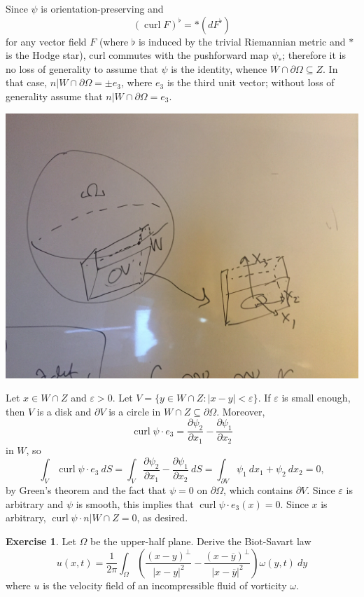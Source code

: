 \documentclass[10pt]{article}
\DeclareMathOperator{\curl}{curl}
\theoremstyle{definition}
\newtheorem{exer}{Exercise}
\begin{document}
Since $\psi$ is orientation-preserving and
\begin{equation}
\label{coordinate invariant curl}
(\curl F)^\flat = *(dF^\flat)
\end{equation}
for any vector field $F$ (where $\flat$ is induced by the trivial Riemannian metric and $*$ is the Hodge star), curl commutes with the pushforward map $\psi_*$; therefore it is no loss of generality to assume that $\psi$ is the identity, whence $W \cap \partial \Omega \subseteq Z$.
In that case, $n|W \cap \partial \Omega = \pm e_3$, where $e_3$ is the third unit vector; without loss of generality assume that $n|W \cap \partial \Omega = e_3$.

\includegraphics[scale=0.07]{fluids_1_coords.jpg}

Let $x \in W \cap Z$ and $\varepsilon > 0$. Let $V = \{y \in W \cap Z: |x - y| < \varepsilon\}$.
If $\varepsilon$ is small enough, then $V$ is a disk and $\partial V$ is a circle in $W \cap Z \subseteq \partial \Omega$.
Moreover,
$$\curl \psi \cdot e_3 = \frac{\partial \psi_2}{\partial x_1} - \frac{\partial \psi_1}{\partial x_2}$$
in $W$, so
$$\int_V \curl \psi \cdot e_3 ~dS = \int_V \frac{\partial \psi_2}{\partial x_1} - \frac{\partial \psi_1}{\partial x_2} ~dS = \int_{\partial V} \psi_1 ~dx_1 + \psi_2 ~dx_2 = 0,$$
by Green's theorem and the fact that $\psi = 0$ on $\partial \Omega$, which contains $\partial V$.
Since $\varepsilon$ is arbitrary and $\psi$ is smooth, this implies that $\curl \psi \cdot e_3(x) = 0$.
Since $x$ is arbitrary, $\curl \psi \cdot n|W \cap Z = 0$, as desired.

\begin{exer}
Let $\Omega$ be the upper-half plane. Derive the Biot-Savart law
$$u(x, t) = \frac{1}{2\pi} \int_\Omega \left(\frac{(x - y)^\perp}{|x - y|^2} - \frac{(x - \overline y)^\perp}{|x - \overline y|^2}\right) \omega(y, t) ~dy$$
where $u$ is the velocity field of an incompressible fluid of vorticity $\omega$.
\end{exer}
\end{document}
